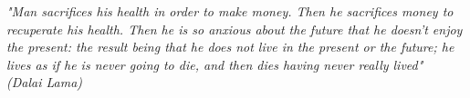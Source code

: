 \begin{epigrafe}
    \vspace*{\fill}
	\begin{flushright}

		\textit{"Man sacrifices his health in order to make money. Then he sacrifices money to recuperate his health. Then he is so anxious about the future that he doesn't enjoy the present: the result being that he does not live in the present or the future; he lives as if he is never going to die, and then dies having never really lived"\\
		(Dalai Lama)}
	\end{flushright}
\end{epigrafe}

